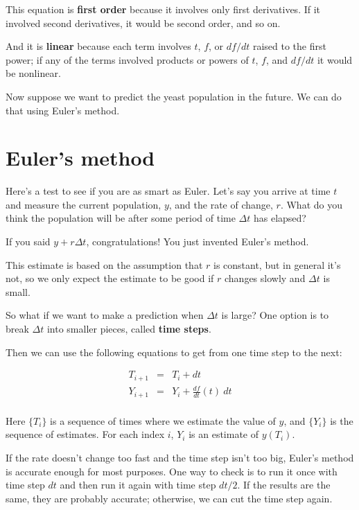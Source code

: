 \documentclass[
]{book}
\numberwithin{Answer}{chapter}
\numberwithin{Exercise}{chapter}
\begin{document}
This equation is {\bf first order} because it involves only first
derivatives.  If it involved second derivatives, it would be second order,
and so on.


And it is {\bf linear} because each term involves $t$, $f$, or
$df/dt$ raised to the first power; if any of the terms involved
products or powers of $t$, $f$, and $df/dt$ it would be
nonlinear.


Now suppose we want to predict the yeast population in the future.  We can do that using Euler's method.


\section{Euler's method}

Here's a test to see if you are as smart as Euler.  Let's say  you arrive at time $t$ and measure the current population, $y$, and
the rate of change, $r$.  What do you think the population will
be after some period of time $\Delta t$ has elapsed?

If you said $y + r \Delta t$, congratulations!  You just invented
Euler's method.


This estimate is based on the assumption that $r$ is constant, but
in general it's not, so we only expect the estimate to be good if
$r$ changes slowly and $\Delta t$ is small.

So what if we want to make a prediction when $\Delta t$ is large?
One option is to break $\Delta t$ into smaller pieces, called
{\bf time steps}.

Then we can use the following equations to get from one time step to the next:

\begin{eqnarray}
\label{eq:euler2}
T_{i+1} &=& T_i + dt                       \\
Y_{i+1} &=& Y_i + \frac{df}{dt}(t)~dt           \\
\end{eqnarray}

Here $\{T_i\}$ is a sequence of times where we estimate the value
of $y$, and $\{Y_i\}$ is the sequence of estimates.  For each
index $i$, $Y_i$ is an estimate of $y(T_i)$.

If the rate doesn't change too fast and the time step isn't
too big, Euler's method is accurate enough for most purposes.  One
way to check is to run it once with time step $dt$ and then run it
again with time step $dt/2$.  If the results are the same, they are
probably accurate; otherwise, we can cut the time step again.
\end{document}
